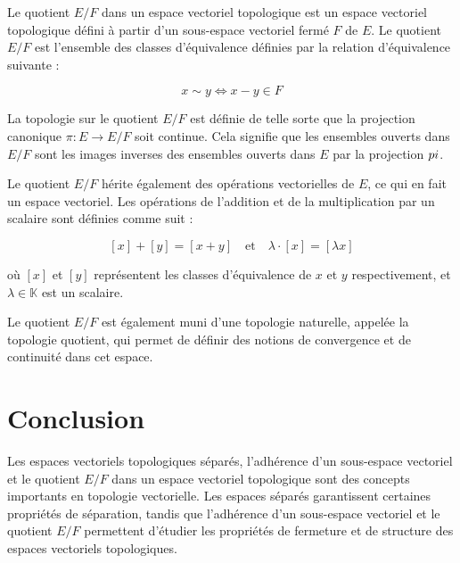 \documentclass{article}
\begin{document}
Le quotient $E/F$ dans un espace vectoriel topologique est un espace vectoriel topologique défini à partir d'un sous-espace vectoriel fermé $F$ de $E$. Le quotient $E/F$ est l'ensemble des classes d'équivalence définies par la relation d'équivalence suivante :

\[
x \sim y \Leftrightarrow x - y \in F
\]

La topologie sur le quotient $E/F$ est définie de telle sorte que la projection canonique $\pi : E \rightarrow E/F$ soit continue. Cela signifie que les ensembles ouverts dans $E/F$ sont les images inverses des ensembles ouverts dans $E$ par la projection $\\pi$.

Le quotient $E/F$ hérite également des opérations vectorielles de $E$, ce qui en fait un espace vectoriel. Les opérations de l'addition et de la multiplication par un scalaire sont définies comme suit :

\[
[x] + [y] = [x + y] \quad \text{et} \quad \lambda \cdot [x] = [\lambda x]
\]

où $[x]$ et $[y]$ représentent les classes d'équivalence de $x$ et $y$ respectivement, et $\lambda \in \mathbb{K}$ est un scalaire.

Le quotient $E/F$ est également muni d'une topologie naturelle, appelée la topologie quotient, qui permet de définir des notions de convergence et de continuité dans cet espace.

\section{Conclusion}

Les espaces vectoriels topologiques séparés, l'adhérence d'un sous-espace vectoriel et le quotient $E/F$ dans un espace vectoriel topologique sont des concepts importants en topologie vectorielle. Les espaces séparés garantissent certaines propriétés de séparation, tandis que l'adhérence d'un sous-espace vectoriel et le quotient $E/F$ permettent d'étudier les propriétés de fermeture et de structure des espaces vectoriels topologiques.
\end{document}
